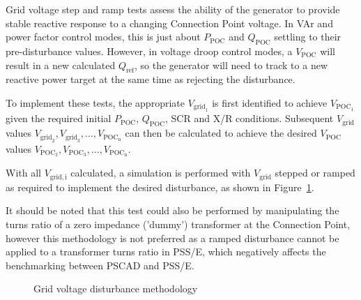Grid voltage step and ramp tests assess the ability of the generator to provide stable reactive response to a changing Connection Point voltage. In VAr and power factor control modes, this is just about  $P_{\mathrm{POC}}$ and $Q_{\mathrm{POC}}$ settling to their pre-disturbance values. However, in voltage droop control modes, a $V_{\mathrm{POC}}$ will result in a new calculated $Q_{\mathrm{ref}}$, so the generator will need to track to a new reactive power target at the same time as rejecting the disturbance.

To implement these tests, the appropriate $V_{\mathrm{grid}_{\mathrm{1}}}$
is first identified to achieve $V_{\mathrm{POC}_{\mathrm{1}}}$ given the required initial $P_{\mathrm{POC}}$, $Q_{\mathrm{POC}}$, SCR and X/R conditions. Subsequent $V_{\mathrm{grid}}$ values $V_{\mathrm{grid}_{\mathrm{2}}}, V_{\mathrm{grid}_{\mathrm{3}}}, \dots, V_{\mathrm{POC}_{\mathrm{n}}}$ can then be calculated to achieve the desired $V_{\mathrm{POC}}$ values $V_{\mathrm{POC}_{\mathrm{2}}}, V_{\mathrm{POC}_{\mathrm{3}}}, \dots, V_{\mathrm{POC}_{\mathrm{n}}}$.

With all $V_{\mathrm{grid,i}}$ calculated, a simulation is performed with $V_{\mathrm{grid}}$ stepped or ramped as required to implement the desired disturbance, as shown in Figure~\ref{fig:smib-vgrid-disturbance-methodology}.

It should be noted that this test could also be performed by manipulating the turns ratio of a zero impedance ('dummy') transformer at the Connection Point, however this methodology is not preferred as a ramped disturbance cannot be applied to a transformer turns ratio in PSS/E, which negatively affects the benchmarking between PSCAD and PSS/E.


\begin{figure}[h]
	\centering
	
	\caption{Grid voltage disturbance methodology}
	\label{fig:smib-vgrid-disturbance-methodology}
\end{figure}